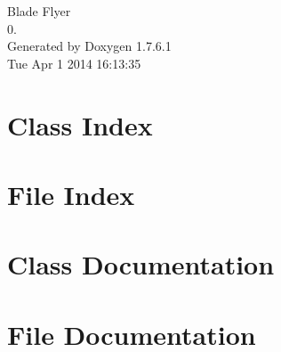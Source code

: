 \documentclass[a4paper]{book}
\begin{document}
\hypersetup{pageanchor=false,citecolor=blue}
\begin{titlepage}
\vspace*{7cm}
\begin{center}
{\Large \-Blade \-Flyer \\[1ex]\large 0. }\\
\vspace*{1cm}
{\large \-Generated by Doxygen 1.7.6.1}\\
\vspace*{0.5cm}
{\small Tue Apr 1 2014 16:13:35}\\
\end{center}
\end{titlepage}
\clearemptydoublepage
{}
\tableofcontents
\clearemptydoublepage
{}
\hypersetup{pageanchor=true,citecolor=blue}
\chapter{\-Class \-Index}

\chapter{\-File \-Index}

\chapter{\-Class \-Documentation}







\chapter{\-File \-Documentation}
















\printindex
\end{document}
